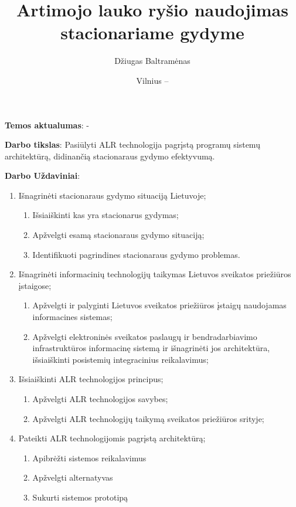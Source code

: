 \documentclass{VUMIFPSbakalaurinis}
\title{Artimojo lauko ryšio naudojimas stacionariame gydyme}
\author{Džiugas Baltramėnas}
\date{Vilnius – \the\year}
\begin{document}
\maketitle

\tableofcontents

    \textbf{Temos aktualumas}: -

    \textbf{Darbo tikslas}: Pasiūlyti ALR technologija pagrįstą programų sistemų architektūrą, didinančią stacionaraus gydymo efektyvumą.
    
    \textbf{Darbo Uždaviniai}:
    \begin{enumerate}
        \item Išnagrinėti stacionaraus gydymo situaciją Lietuvoje;
        \begin{enumerate}
            \item Išsiaiškinti kas yra stacionarus gydymas;
            \item Apžvelgti esamą stacionaraus gydymo situaciją;
            \item Identifikuoti pagrindines stacionaraus gydymo problemas.
        \end{enumerate}
        \item Išnagrinėti informacinių technologijų taikymas Lietuvos sveikatos priežiūros įstaigose;
        \begin{enumerate}
            \item Apžvelgti ir palyginti Lietuvos sveikatos priežiūros įstaigų naudojamas informacines sistemas;
            \item Apžvelgti elektroninės sveikatos paslaugų ir bendradarbiavimo infrastruktūros informacinę sistemą ir išnagrinėti jos architektūra, išsiaiškinti posistemių integracinius reikalavimus;
        \end{enumerate}
        \item Išsiaiškinti ALR technologijos principus;
        \begin{enumerate}
            \item Apžvelgti ALR technologijos savybes;
            \item Apžvelgti ALR technologijų taikymą sveikatos priežiūros srityje;
        \end{enumerate}
        \item Pateikti ALR  technologijomis pagrįstą architektūrą;
        \begin{enumerate}
            \item Apibrėžti sistemos reikalavimus
            \item Apžvelgti alternatyvas
            \item Sukurti sistemos prototipą
        \end{enumerate}
    \end{enumerate}
\end{document}

